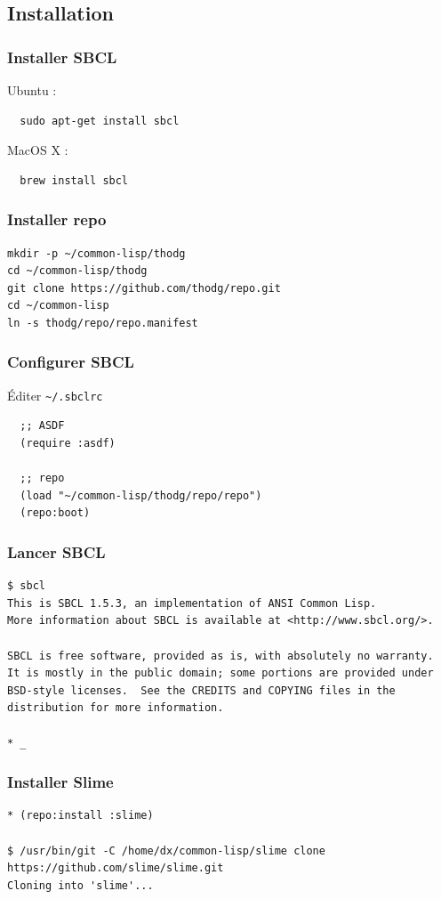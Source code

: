\documentclass[8pt]{beamer}
\begin{document}
\subsection{Installation}

\begin{frame}[fragile]
  \frametitle{Installer SBCL}
  Ubuntu :
\begin{verbatim}
  sudo apt-get install sbcl
\end{verbatim}
  MacOS X :
\begin{verbatim}
  brew install sbcl
\end{verbatim}
\end{frame}

\begin{frame}[fragile]
  \frametitle{Installer repo}
\begin{verbatim}
mkdir -p ~/common-lisp/thodg
cd ~/common-lisp/thodg
git clone https://github.com/thodg/repo.git
cd ~/common-lisp
ln -s thodg/repo/repo.manifest
\end{verbatim}
\end{frame}

\begin{frame}[fragile]
  \frametitle{Configurer SBCL}
  Éditer \tt{\textasciitilde/.sbclrc}
\begin{verbatim}
  ;; ASDF
  (require :asdf)

  ;; repo
  (load "~/common-lisp/thodg/repo/repo")
  (repo:boot)
\end{verbatim}
\end{frame}

\begin{frame}[fragile]
  \frametitle{Lancer SBCL}
\begin{verbatim}
$ sbcl
This is SBCL 1.5.3, an implementation of ANSI Common Lisp.
More information about SBCL is available at <http://www.sbcl.org/>.

SBCL is free software, provided as is, with absolutely no warranty.
It is mostly in the public domain; some portions are provided under
BSD-style licenses.  See the CREDITS and COPYING files in the
distribution for more information.

* _
\end{verbatim}
\end{frame}

\begin{frame}[fragile]
  \frametitle{Installer Slime}
\begin{verbatim}
* (repo:install :slime)

$ /usr/bin/git -C /home/dx/common-lisp/slime clone https://github.com/slime/slime.git
Cloning into 'slime'...
\end{verbatim}
\end{frame}
\end{document}
